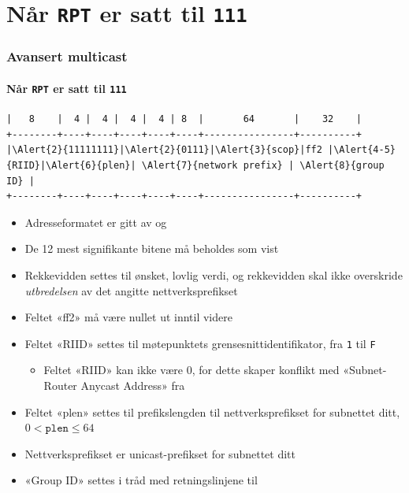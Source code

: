 \section{Når \texttt{RPT} er satt til \texttt{111}}
\begin{frame}[fragile]%
  \frametitle{Avansert multicast}
  \framesubtitle{Når \texttt{RPT} er satt til \texttt{111}}
\begin{Verbatim}[commandchars=\\\{\},fontsize=\tiny]
|   8    |  4 |  4 |  4 |  4 | 8  |       64       |    32    |
+--------+----+----+----+----+----+----------------+----------+
|\Alert{2}{11111111}|\Alert{2}{0111}|\Alert{3}{scop}|ff2 |\Alert{4-5}{RIID}|\Alert{6}{plen}| \Alert{7}{network prefix} | \Alert{8}{group ID} |
+--------+----+----+----+----+----+----------------+----------+
\end{Verbatim}
  \begin{itemize}%
  \item Adresseformatet er gitt av  og 
  \item \alert<2>{De 12 mest signifikante bitene} må beholdes som vist
  \item \alert<3>{Rekkevidden} settes til ønsket, lovlig verdi, og
    rekkevidden skal ikke overskride \textit{utbredelsen\/} av det
    angitte nettverksprefikset
  \item Feltet «ff2» må være nullet ut inntil videre
  \item Feltet «RIID» settes til \alert<4>{møtepunktets
      grensesnittidentifikator}, fra \texttt{1} til \texttt{F}
    \begin{itemize}%
    \item Feltet \alert<5>{«RIID»} kan ikke være \(0\), for dette skaper
      konflikt med «Subnet-Router Anycast Address» fra 
    \end{itemize}
  \item Feltet «plen» settes til \alert<6>{prefikslengden til
      nettverksprefikset for subnettet ditt}, \(0<\mathtt{plen}\le64\)
  \item \alert<7>{Nettverksprefikset} er unicast-prefikset for
    subnettet ditt
  \item \alert<8>{«Group ID»} settes i tråd med retningslinjene til
  \end{itemize}
\end{frame}

